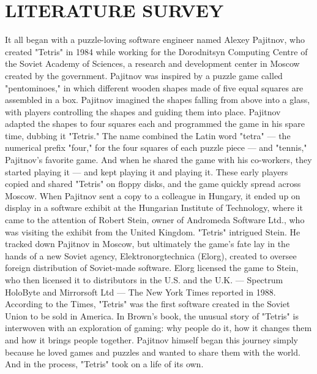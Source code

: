 \newpage
\section{LITERATURE SURVEY}

\hspace{5mm}It all began with a puzzle-loving software engineer named Alexey Pajitnov, who created "Tetris" in 1984 while working for the Dorodnitsyn Computing Centre of the Soviet Academy of Sciences, a research and development center in Moscow created by the government.
Pajitnov was inspired by a puzzle game called "pentominoes," in which different wooden shapes made of five equal squares are assembled in a box. Pajitnov imagined the shapes falling from above into a glass, with players controlling the shapes and guiding them into place. Pajitnov adapted the shapes to four squares each and programmed the game in his spare time, dubbing it "Tetris." The name combined the Latin word "tetra" — the numerical prefix "four," for the four squares of each puzzle piece — and "tennis," Pajitnov's favorite game.
And when he shared the game with his co-workers, they started playing it — and kept playing it and playing it. These early players copied and shared "Tetris" on floppy disks, and the game quickly spread across Moscow. When Pajitnov sent a copy to a colleague in Hungary, it ended up on display in a software exhibit at the Hungarian Institute of Technology, where it came to the attention of Robert Stein, owner of Andromeda Software Ltd., who was visiting the exhibit from the United Kingdom.
"Tetris" intrigued Stein. He tracked down Pajitnov in Moscow, but ultimately the game's fate lay in the hands of a new Soviet agency, Elektronorgtechnica (Elorg), created to oversee foreign distribution of Soviet-made software. Elorg licensed the game to Stein, who then licensed it to distributors in the U.S. and the U.K. — Spectrum HoloByte and Mirrorsoft Ltd — The New York Times reported in 1988. According to the Times, "Tetris" was the first software created in the Soviet Union to be sold in America.
In Brown's book, the unusual story of "Tetris" is interwoven with an exploration of gaming: why people do it, how it changes them and how it brings people together. Pajitnov himself began this journey simply because he loved games and puzzles and wanted to share them with the world. And in the process, "Tetris" took on a life of its own.